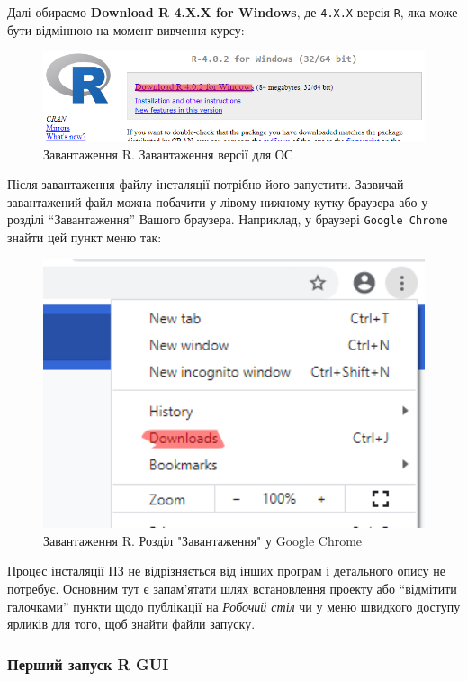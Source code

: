 \documentclass[
]{book}
\begin{document}
Далі обираємо \textbf{Download R 4.X.X for Windows}, де \texttt{4.X.X} версія \texttt{R}, яка може бути відмінною на момент вивчення курсу:

\begin{figure}
\includegraphics[width=10.92in]{images/chapter1/r_gui_3} \caption{Завантаження R. Завантаження версії для ОС}\label{fig:unnamed-chunk-3}
\end{figure}

Після завантаження файлу інсталяції потрібно його запустити. Зазвичай завантажений файл можна побачити у лівому нижному кутку браузера або у розділі ``Завантаження'' Вашого браузера. Наприклад, у браузері \texttt{Google\ Chrome} знайти цей пункт меню так:

\begin{figure}
\includegraphics[width=4.56in]{images/chapter1/chrome_download_button} \caption{Завантаження R. Розділ "Завантаження" у Google Chrome}\label{fig:unnamed-chunk-4}
\end{figure}

Процес інсталяції ПЗ не відрізняється від інших програм і детального опису не потребує. Основним тут є запам'ятати шлях встановлення проекту або ``відмітити галочками'' пункти щодо публікації на \emph{Робочий стіл} чи у меню швидкого доступу ярликів для того, щоб знайти файли запуску.

\hypertarget{chapter1312}{%
\subsubsection{Перший запуск R GUI}\label{chapter1312}}
\end{document}
